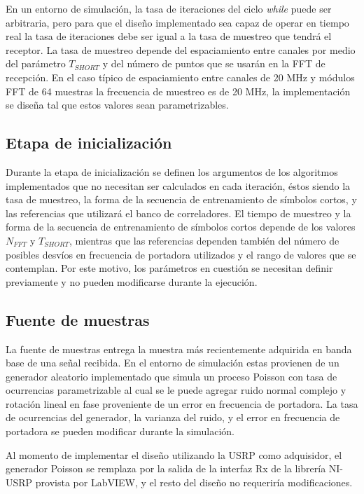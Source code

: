 En un entorno de simulación, la tasa de iteraciones del ciclo \textit{while} puede ser arbitraria, pero para que el diseño implementado sea capaz de operar en tiempo real la tasa de iteraciones debe ser igual a la tasa de muestreo que tendrá el receptor. La tasa de muestreo depende del espaciamiento entre canales por medio del parámetro $T_{SHORT}$ y del número de puntos que se usarán en la FFT de recepción. En el caso típico de espaciamiento entre canales de 20 MHz y módulos FFT de 64 muestras la frecuencia de muestreo es de 20 MHz, la implementación se diseña tal que estos valores sean parametrizables.

\subsection{Etapa de inicialización}

Durante la etapa de inicialización se definen los argumentos de los algoritmos implementados que no necesitan ser calculados en cada iteración, éstos siendo la tasa de muestreo, la forma de la secuencia de entrenamiento de símbolos cortos, y las referencias que utilizará el banco de correladores. El tiempo de muestreo y la forma de la secuencia de entrenamiento de símbolos cortos depende de los valores $N_{FFT}$ y $T_{SHORT}$, mientras que las referencias dependen también del número de posibles desvíos en frecuencia de portadora utilizados y el rango de valores que se contemplan. Por este motivo, los parámetros en cuestión se necesitan definir previamente y no pueden modificarse durante la ejecución. 

\subsection{Fuente de muestras}

La fuente de muestras entrega la muestra más recientemente adquirida en banda base de una señal recibida. En el entorno de simulación estas provienen de un generador aleatorio implementado que simula un proceso Poisson con tasa de ocurrencias parametrizable al cual se le puede agregar ruido normal complejo y rotación lineal en fase proveniente de un error en frecuencia de portadora. La tasa de ocurrencias del generador, la varianza del ruido, y el error en frecuencia de portadora se pueden modificar durante la simulación.

Al momento de implementar el diseño utilizando la USRP como adquisidor, el generador Poisson se remplaza por la salida de la interfaz Rx de la librería NI-USRP provista por LabVIEW, y el resto del diseño no requeriría modificaciones.


